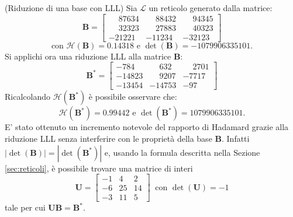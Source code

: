 \begin{exmp} (Riduzione di una base con LLL)
    Sia $\mathcal{L}$ un reticolo generato dalla matrice:
    \begin{equation*}
        \mathbf{B} =
        \begin{bmatrix*}
            \phantom{-}87634 & \phantom{-}88432 & \phantom{-}94345\\
            \phantom{-}32323 & \phantom{-}27883 & \phantom{-}40323\\
            -21221           & -11234           & -32123
        \end{bmatrix*}
    \end{equation*}
    \[
        \text{con } \mathcal{H}(\mathbf{B}) = 0.14318 \text{ e } \det(\mathbf{B}) = -1079906335101.
    \]
    Si applichi ora una riduzione LLL alla matrice $\mathbf{B}$:
    \begin{equation*}
        \mathbf{B}^* =
        \begin{bmatrix*}
            -784 & \phantom{-}632  & \phantom{-}2701\\
            -14823 & \phantom{-}9207          & -7717\\
            -13454 & -14753 & -97
        \end{bmatrix*}
    \end{equation*}
    Ricalcolando $\mathcal{H}(\mathbf{B}^*)$ è possibile osservare che:
    \[
        \mathcal{H}(\mathbf{B}^*) = 0.99442 \text{ e }\det(\mathbf{B}^*) = 1079906335101.
    \]
    E' stato ottenuto un incremento notevole del rapporto di Hadamard grazie alla riduzione LLL senza 
    interferire con le proprietà della base $\mathbf{B}$. Infatti $|\det(\mathbf{B})| = |\det(\mathbf{B}^*)|$ e,
    usando la formula descritta nella Sezione \ref{sec:reticoli}, 
    è possibile trovare una matrice di interi
    \begin{equation*}
        \mathbf{U} =
        \begin{bmatrix*}
            -1 & 4 & 2\\
            -6 & 25 & 14\\
            -3 & 11 & 5
        \end{bmatrix*}
        \ \text{ con } \det(\mathbf{U}) = -1
    \end{equation*}
    tale per cui $\mathbf{U}\mathbf{B} = \mathbf{B}^*$.
\end{exmp}

